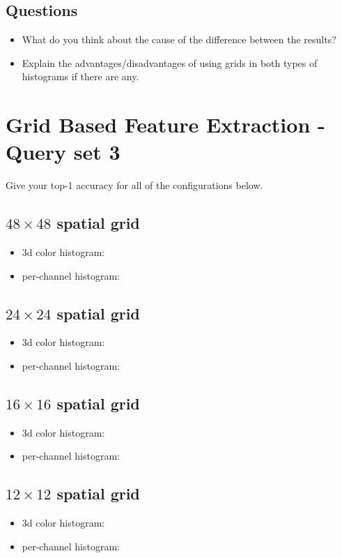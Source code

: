 \documentclass[12pt]{article}
\begin{document}
\subsection{Questions}
\begin{itemize}
\item What do you think about the cause of the difference between the results?
\item Explain the advantages/disadvantages of using grids in both types of histograms if there are any.
\end{itemize}


\section{Grid Based Feature Extraction - Query set 3}
Give your top-1 accuracy for all of the configurations below.

\subsection{$48\times48$ spatial grid}
\begin{itemize}
\item 3d color histogram:
\item per-channel histogram:
\end{itemize}

\subsection{$24\times24$ spatial grid}
\begin{itemize}
\item 3d color histogram:
\item per-channel histogram:
\end{itemize}

\subsection{$16\times16$ spatial grid}
\begin{itemize}
\item 3d color histogram:
\item per-channel histogram:
\end{itemize}

\subsection{$12\times12$ spatial grid}
\begin{itemize}
\item 3d color histogram:
\item per-channel histogram:
\end{itemize}
\end{document}
